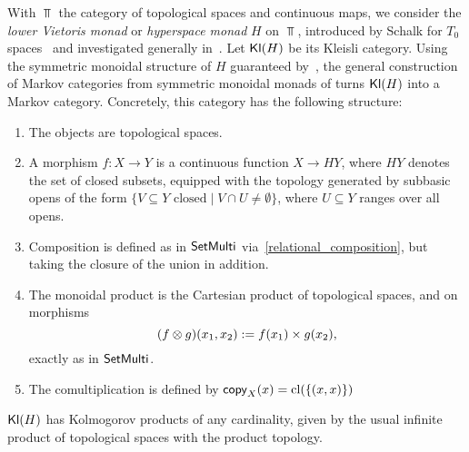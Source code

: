\documentclass[11pt]{article}
\begin{document}
With $\Top$ the category of topological spaces and continuous maps, we consider the \emph{lower Vietoris monad} or \emph{hyperspace monad} $H$ on $\Top$, introduced by Schalk for $T_0$ spaces~\cite{schalk} and investigated generally in~\cite[Section~2]{hyperspace}. Let $\operatorname{\mathsf{Kl}}(H)$ be its Kleisli category. Using the symmetric monoidal structure of $H$ guaranteed by~\cite[Corollary~2.53]{hyperspace}, the general construction of Markov categories from symmetric monoidal monads of \cite[Proposition~3.1]{markov_cats} turns $\operatorname{\mathsf{Kl}}(H)$ into a Markov category. Concretely, this category has the following structure:
    \begin{enumerate}
        \item The objects are topological spaces.
	\item A morphism $f: X \to Y$ is a continuous function $X \to HY$, where $HY$ denotes the set of closed subsets, equipped with the topology generated by subbasic opens of the form $\{V \subseteq Y \text{ closed} \mid V \cap U \neq \emptyset\}$, where $U \subseteq Y$ ranges over all opens.
	\item Composition is defined as in $\operatorname{\mathsf{SetMulti}}$ via~\eqref{relational_composition}, but taking the closure of the union in addition.
        \item The monoidal product is the Cartesian product of topological spaces, and on morphisms
		\[
			(f \otimes g)(x_1,x_2) := f(x_1) \times g(x_2),
		\]
		exactly as in $\operatorname{\mathsf{SetMulti}}$.
        \item The comultiplication is defined by $\mathsf{copy}_{X}(x) = \operatorname{cl}(\{(x,x)\})$
    \end{enumerate}
\begin{proposition}
    $\operatorname{\mathsf{Kl}}(H)$ has Kolmogorov products of any cardinality, given by the usual infinite product of topological spaces with the product topology.
\end{proposition}
\end{document}
